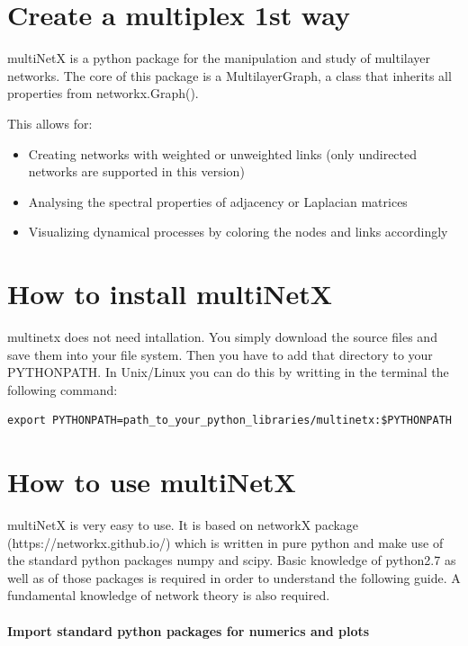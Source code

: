 \documentclass[]{article}
\author{}
\date{}
\begin{document}
\section{Create a multiplex 1st way}\label{create-a-multiplex-1st-way}

multiNetX is a python package for the manipulation and study of
multilayer networks. The core of this package is a MultilayerGraph, a
class that inherits all properties from networkx.Graph().

This allows for:

\begin{itemize}
\itemsep1pt\parskip0pt
\item
  Creating networks with weighted or unweighted links (only undirected
  networks are supported in this version)
\item
  Analysing the spectral properties of adjacency or Laplacian matrices
\item
  Visualizing dynamical processes by coloring the nodes and links
  accordingly
\end{itemize}

\section{How to install multiNetX}\label{how-to-install-multinetx}

multinetx does not need intallation. You simply download the source
files and save them into your file system. Then you have to add that
directory to your PYTHONPATH. In Unix/Linux you can do this by writting
in the terminal the following command:

\begin{verbatim}
export PYTHONPATH=path_to_your_python_libraries/multinetx:$PYTHONPATH
\end{verbatim}

\section{How to use multiNetX}\label{how-to-use-multinetx}

multiNetX is very easy to use. It is based on networkX package
(https://networkx.github.io/) which is written in pure python and make
use of the standard python packages numpy and scipy. Basic knowledge of
python2.7 as well as of those packages is required in order to
understand the following guide. A fundamental knowledge of network
theory is also required.

\paragraph{Import standard python packages for numerics and
plots}\label{import-standard-python-packages-for-numerics-and-plots}
\end{document}
